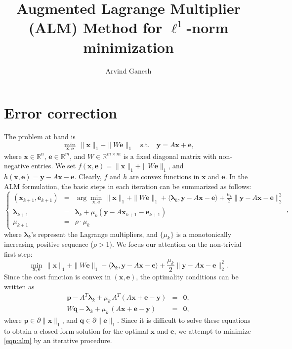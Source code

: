 \documentclass{article}
\title{Augmented Lagrange Multiplier (ALM) Method for $\ell^1$-norm minimization}
\author{Arvind Ganesh}
\newcommand{\x}{\mathbf{x}}
\newcommand{\y}{\mathbf{y}}
\newcommand{\e}{\mathbf{e}}
\newcommand{\R}{\mathbb{R}}
\newcommand{\bl}{\boldsymbol{\lambda}}
\newcommand{\p}{\mathbf{p}}
\newcommand{\q}{\mathbf{q}}
\begin{document}
\maketitle

\section{Error correction}

The problem at hand is 
\begin{equation}
\min_{\x,\e} \, \|\x\|_1 + \|W\e\|_1 \quad \mathrm{s.t.} \quad \y = A\x + \e,
\end{equation}
where $\x \in \R^n$, $\e \in \R^m$, and $W \in \R^{m \times m}$ is a fixed diagonal matrix with non-negative entries. 
\smallbreak
We set $f(\x,\e) = \|\x\|_1 + \|W\e\|_1$, and $h(\x,\e) = \y - A\x - \e$. Clearly, $f$ and $h$ are convex functions in $\x$ and $\e$. In the ALM formulation, the basic steps in each iteration can be summarized as follows:
\begin{equation}
\left \{ 
\begin{array}{lll}
(\x_{k+1},\e_{k+1}) & = & \arg\min_{\x,\e} \, \|\x\|_1 + \|W\e\|_1 + \langle \bl_k, \y - A\x - \e \rangle + \frac{\mu_k}{2}\|\y - A\x - \e\|_2^2 \\
\bl_{k+1} & = & \bl_k + \mu_k (\y - A\x_{k+1} - \e_{k+1}) \\
\mu_{k+1} & = & \rho\cdot\mu_k
\end{array} 
\right . ,
\end{equation}
where $\bl_k$'s represent the Lagrange multipliers, and $\{\mu_k\}$ is a monotonically increasing positive sequence ($\rho > 1$).
\smallbreak
We focus our attention on the non-trivial first step:
\begin{equation}
\min_{\x,\e} \, \|\x\|_1 + \|W\e\|_1 + \langle \bl_k, \y - A\x - \e \rangle + \frac{\mu_k}{2}\|\y - A\x - \e\|_2^2.
\label{eqn:alm}
\end{equation}
Since the cost function is convex in $(\x,\e)$, the optimality conditions can be written as
\begin{equation}
\begin{array}{lll}
\p - A^T\bl_k + \mu_k\,A^T(A\x + \e - \y) & = & \mathbf{0}, \\
W\q - \bl_k + \mu_k\, (A\x + \e -\y) & = & \mathbf{0},
\end{array}
\end{equation}
where $\p \in \partial \|\x\|_1$, and $\q \in \partial \|\e\|_1$. Since it is difficult to solve these equations to obtain a closed-form solution for the optimal $\x$ and $\e$, we attempt to minimize \eqref{eqn:alm} by an iterative procedure. 
\end{document}
